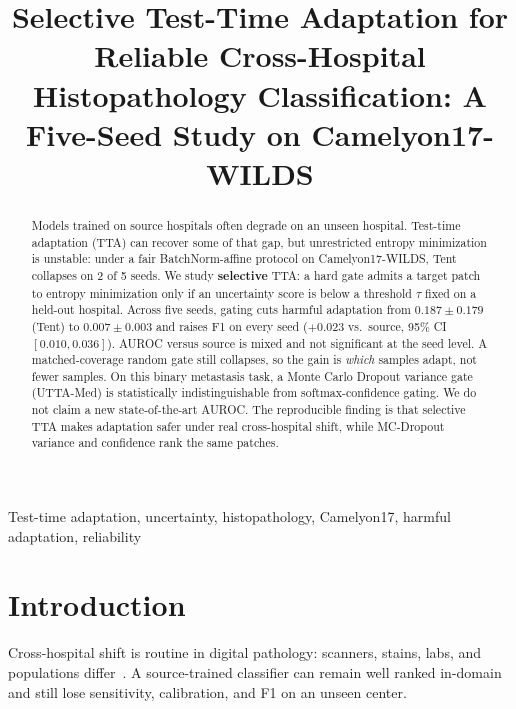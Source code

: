 \documentclass[conference]{IEEEtran}
\begin{document}
\title{Selective Test-Time Adaptation for Reliable Cross-Hospital\\
Histopathology Classification: A Five-Seed Study on Camelyon17-WILDS}

\author{
}

\maketitle

\begin{abstract}
Models trained on source hospitals often degrade on an unseen hospital.
Test-time adaptation (TTA) can recover some of that gap, but unrestricted entropy minimization is unstable: under a fair BatchNorm-affine protocol on Camelyon17-WILDS, Tent collapses on 2 of 5 seeds.
We study \textbf{selective} TTA: a hard gate admits a target patch to entropy minimization only if an uncertainty score is below a threshold $\tau$ fixed on a held-out hospital.
Across five seeds, gating cuts harmful adaptation from $0.187\pm0.179$ (Tent) to $0.007\pm0.003$ and raises F1 on every seed ($+0.023$ vs.\ source, 95\% CI $[0.010,0.036]$).
AUROC versus source is mixed and not significant at the seed level.
A matched-coverage random gate still collapses, so the gain is \emph{which} samples adapt, not fewer samples.
On this binary metastasis task, a Monte Carlo Dropout variance gate (UTTA-Med) is statistically indistinguishable from softmax-confidence gating.
We do not claim a new state-of-the-art AUROC.
The reproducible finding is that selective TTA makes adaptation safer under real cross-hospital shift, while MC-Dropout variance and confidence rank the same patches.
\end{abstract}

\begin{IEEEkeywords}
Test-time adaptation, uncertainty, histopathology, Camelyon17, harmful adaptation, reliability
\end{IEEEkeywords}

\section{Introduction}
Cross-hospital shift is routine in digital pathology: scanners, stains, labs, and populations differ~\cite{koh2021wilds,bandi2018camelyon17}.
A source-trained classifier can remain well ranked in-domain and still lose sensitivity, calibration, and F1 on an unseen center.
\end{document}
